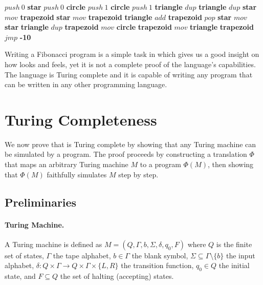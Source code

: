 \begin{algorithm}[H]
    \caption{Fibonacci sequence in \sculpt}
    \label{alg:fib}
    \small
    \begin{algorithmic}
    \State $push~0$ \textbf{star}
    \State $push~0$ \textbf{circle}
    \State $push~1$ \textbf{circle}
    \State $push~1$ \textbf{triangle}
    \State $dup$ \textbf{triangle}
    \State $dup$ \textbf{star}
    \State $mov$ \textbf{trapezoid} \textbf{star}
    \State $mov$ \textbf{trapezoid} \textbf{triangle}
    \State $add$ \textbf{trapezoid}
    \State $pop$ \textbf{star}
    \State $mov$ \textbf{star} \textbf{triangle}
    \State $dup$ \textbf{trapezoid}
    \State $mov$ \textbf{circle} \textbf{trapezoid}
    \State $mov$ \textbf{triangle} \textbf{trapezoid}
    \State $jmp$ \textbf{-10}
    \end{algorithmic}
    \end{algorithm}



Writing a Fibonacci program is a simple task in \sculpt which gives us a good insight on how \sculpt looks and feels, yet it is not a complete proof of the language's capabilities.
The language is Turing complete and it is capable of writing any program that can be written in any other programming language.


\section{Turing Completeness}
\label{sec:results:turing}

We now prove that \sculpt is Turing complete by showing that any Turing machine can be simulated by a \sculpt program. The proof proceeds by constructing a translation $\Phi$ that maps an arbitrary Turing machine $M$ to a \sculpt program $\Phi(M)$, then showing that $\Phi(M)$ faithfully simulates $M$ step by step.

\subsection{Preliminaries}
\label{sec:results:turing:prelim}

\paragraph{Turing Machine.}
A Turing machine is defined as $M = (Q, \Gamma, b, \Sigma, \delta, q_0, F)$ where $Q$ is the finite set of states, $\Gamma$ the tape alphabet, $b \in \Gamma$ the blank symbol, $\Sigma \subseteq \Gamma \setminus \{b\}$ the input alphabet, $\delta: Q \times \Gamma \to Q \times \Gamma \times \{L, R\}$ the transition function, $q_0 \in Q$ the initial state, and $F \subseteq Q$ the set of halting (accepting) states.

